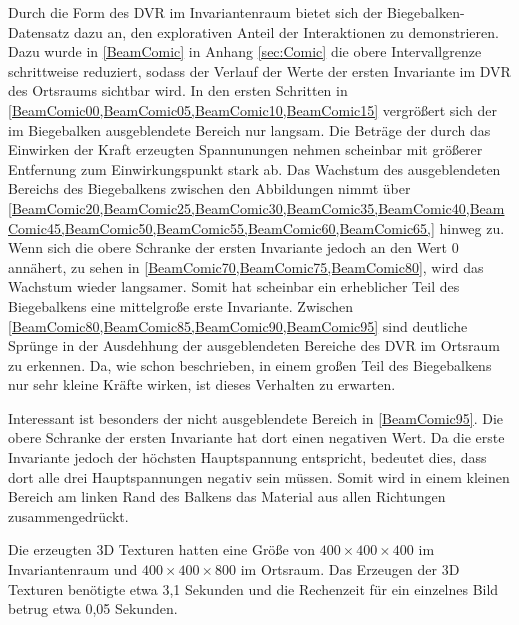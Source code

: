 \documentclass[a4paper,fontsize=12pt,toc=bib,parskip=half,ngerman]{scrartcl}
\begin{document}
Durch die Form des DVR im Invariantenraum bietet sich der Biegebalken-Datensatz dazu an, den explorativen Anteil der Interaktionen zu demonstrieren. Dazu wurde in \cref{BeamComic} in Anhang \ref{sec:Comic} die obere Intervallgrenze schrittweise reduziert, sodass der Verlauf der Werte der ersten Invariante im DVR des Ortsraums sichtbar wird. In den ersten Schritten in \cref{BeamComic00,BeamComic05,BeamComic10,BeamComic15} vergr\"o{\ss}ert sich der im Biegebalken ausgeblendete Bereich nur langsam. Die Betr\"age der durch das Einwirken der Kraft erzeugten Spannunungen nehmen scheinbar mit gr\"o{\ss}erer Entfernung zum Einwirkungspunkt stark ab. Das Wachstum des ausgeblendeten Bereichs des Biegebalkens zwischen den Abbildungen nimmt \"uber \cref{BeamComic20,BeamComic25,BeamComic30,BeamComic35,BeamComic40,BeamComic45,BeamComic50,BeamComic55,BeamComic60,BeamComic65,} hinweg zu. Wenn sich die obere Schranke der ersten Invariante jedoch an den Wert 0 ann\"ahert, zu sehen in \cref{BeamComic70,BeamComic75,BeamComic80}, wird das Wachstum wieder langsamer. Somit hat scheinbar ein erheblicher Teil des Biegebalkens eine mittelgro{\ss}e erste Invariante. Zwischen \cref{BeamComic80,BeamComic85,BeamComic90,BeamComic95} sind deutliche Spr\"unge in der Ausdehhung der ausgeblendeten Bereiche des DVR im Ortsraum zu erkennen. Da, wie schon beschrieben, in einem gro{\ss}en Teil des Biegebalkens nur sehr kleine Kr\"afte wirken, ist dieses Verhalten zu erwarten.

Interessant ist besonders der nicht ausgeblendete Bereich in \cref{BeamComic95}. Die obere Schranke der ersten Invariante hat dort einen negativen Wert. Da die erste Invariante jedoch der h\"ochsten Hauptspannung entspricht, bedeutet dies, dass dort alle drei Hauptspannungen negativ sein m\"ussen. Somit wird in einem kleinen Bereich am linken Rand des Balkens das Material aus allen Richtungen zusammengedr\"uckt.

Die erzeugten 3D Texturen hatten eine Gr\"o{\ss}e von $400\times400\times400$ im Invariantenraum und $400\times400\times800$ im Ortsraum. Das Erzeugen der 3D Texturen ben\"otigte etwa 3,1 Sekunden und die Rechenzeit f\"ur ein einzelnes Bild betrug etwa 0,05 Sekunden.
\end{document}
